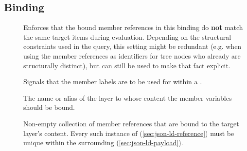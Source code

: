 \documentclass[11pt,a4paper]{article}
\begin{document}
\subsection{Binding}
\label{sec:json-ld-binding}
\begin{attributes}{}
\end{attributes}
\begin{description}
	\item[] Enforces that the bound member references in this binding do \textbf{not} match the same target items during evaluation. Depending on the structural constraints used in the query, this setting might be redundant (e.g. when using the member references as identifiers for tree nodes who already are structurally distinct), but can still be used to make that fact explicit. 
	\item[] Signals that the member labels are to be used for  within a .
	\item[] The name or alias of the layer to whose content the member variables should be bound.
\end{description}
\begin{elements}{}
\end{elements}
\begin{description}
	\item[] Non-empty collection of member references that are bound to the target layer's content. Every such instance of  (\ref{sec:json-ld-reference}) must be unique within the surrounding  (\ref{sec:json-ld-payload}).
\end{description}
\end{document}

